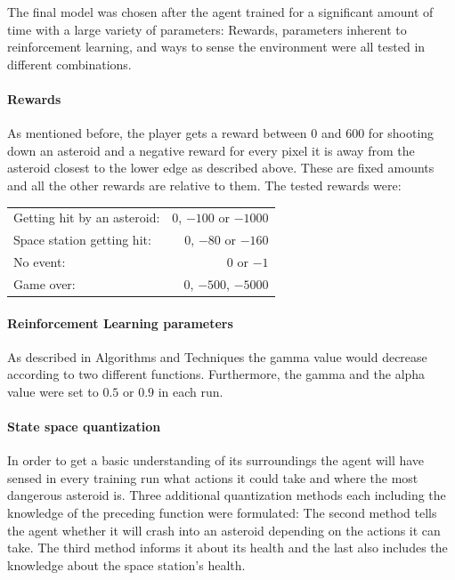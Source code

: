 \documentclass[a4paper,10pt]{article}
\begin{document}

The final model was chosen after the agent trained for a significant amount of time with a large variety of parameters: 
Rewards, parameters inherent to reinforcement learning, and ways to sense the environment were all tested in different combinations.

\paragraph{Rewards}
As mentioned before, the player gets a reward between 0 and 600 for shooting down an asteroid and a negative reward for every pixel it is away from the asteroid closest to the lower edge as described above.
These are fixed amounts and all the other rewards are relative to them.
The tested rewards were:
\begin{center}
\begin{tabular}{lr}
Getting hit by an asteroid: & $0$, $-100$ or $-1000$\\
Space station getting hit: & $0$, $-80$ or $-160$\\
No event: & $0$ or $-1$\\
Game over: & $0$, $-500$, $-5000$\\
\end{tabular}
\end{center}

\paragraph{Reinforcement Learning parameters}
As described in Algorithms and Techniques the gamma value would decrease according to two different functions.
Furthermore, the gamma and the alpha value were set to $0.5$ or $0.9$ in each run.

\paragraph{State space quantization}
In order to get a basic understanding of its surroundings the agent will have sensed in every training run what actions it could take and where the most dangerous asteroid is.
Three additional quantization methods each including the knowledge of the preceding function were formulated:
The second method tells the agent whether it will crash into an asteroid depending on the actions it can take.
The third method informs it about its health and the last also includes the knowledge about the space station's health.
\end{document}
